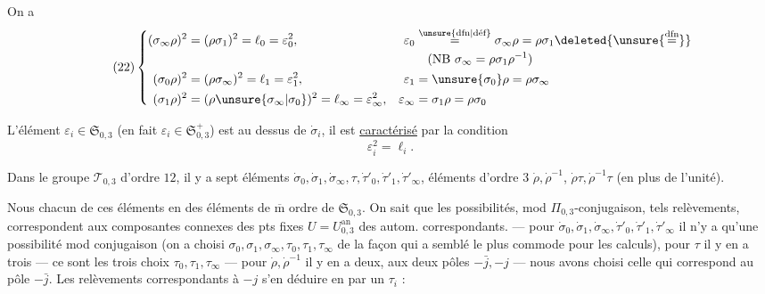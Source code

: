 

On a
\[
\tag{22}
\left\{\begin{aligned}
(\sigma_\infty\rho)^2&=(\rho\sigma_1)^2=\ell_0=\varepsilon_0^2,&
\varepsilon_0&\overset{\unsure{\text{dfn}|\text{déf}}}{=}\sigma_\infty\rho=\rho\sigma_1\deleted{\unsure{\overset{\mathrm{dfn}}{=}}}
\\[-1pt]&&&\quad(\mathrm{NB}\ \sigma_\infty=\rho\sigma_1\rho^{-1})\\
(\sigma_0\rho)^2&=(\rho\sigma_\infty)^2=\ell_1=\varepsilon_1^2,&
\varepsilon_1&=\unsure{\sigma_0}\rho=\rho\sigma_\infty\\
(\sigma_1\rho)^2&=(\rho\unsure{\sigma_\infty|\sigma_0})^2=\ell_\infty=\varepsilon_\infty^2,&
\varepsilon_\infty&=\sigma_1\rho=\rho\sigma_0
\end{aligned}\right.
\]

L'élément $\varepsilon_i\in\mathfrak S_{0,3}$
(en fait $\varepsilon_i\in\mathfrak S_{0,3}^{+}$) est au dessus de $\dot\sigma_i$,
il est \uline{caractérisé} par la condition
\[
\varepsilon_i^2=\ell_i.
\]

Dans le groupe $\mathcal T_{0,3}$ d'ordre $12$, il y a sept éléments 
$\dot\sigma_0,\dot\sigma_1,\dot\sigma_\infty,\tau,\dot\tau'_0,\dot\tau'_1,\dot\tau'_\infty$,
  éléments d'ordre $3$
$\dot\rho,\dot\rho^{-1}$, 
$\dot\rho\tau,\dot\rho^{-1}\tau$ (en plus de l'unité).

Nous   chacun de ces éléments en des éléments de $\overline{\mathrm m}$ ordre de
$\mathfrak S_{0,3}$.
On sait que les possibilités, mod $\Pi_{0,3}$-conjugaison,  tels relèvements,
correspondent aux composantes connexes des pts fixes  $U=U_{0,3}^{\mathrm{an}}$
des autom.  correspondants. --- pour
$\dot\sigma_0,\dot\sigma_1,\dot\sigma_\infty,\dot\tau'_0,\dot\tau'_1,\dot\tau'_\infty$
il n'y a qu'une possibilité mod conjugaison (on a choisi
$\sigma_0,\sigma_1,\sigma_\infty,\tau_0,\tau_1,\tau_\infty$
de la façon qui a semblé le plus commode pour les calculs),
pour $\tau$ il y en a trois --- ce sont les trois choix $\tau_0,\tau_1,\tau_\infty$
--- pour $\dot\rho,\dot\rho^{-1}$ il y en a deux,
 aux deux pôles $-\bar j,-j$ --- nous avons choisi celle qui
correspond au pôle $-\bar j$.
Les relèvements correspondants à $-j$  s'en déduire en  par un $\tau_i$ :

